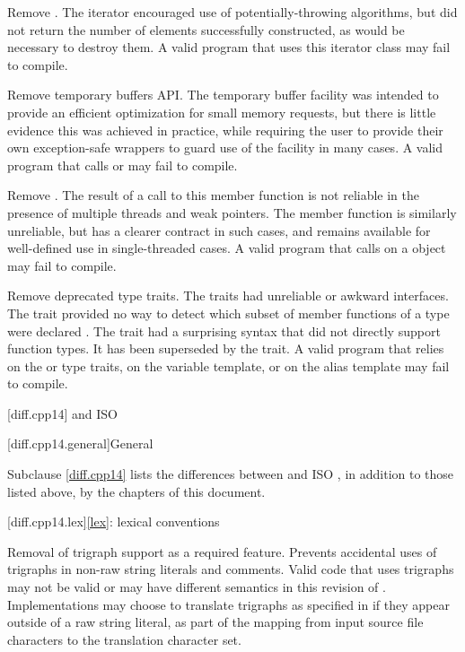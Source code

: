 \nodiffref
\change
Remove .
\rationale
The iterator encouraged use of potentially-throwing algorithms, but did
not return the number of elements successfully constructed,
as would be necessary to destroy them.
\effect
A valid \CppXVII{} program that uses this iterator class may fail to compile.

\nodiffref
\change
Remove temporary buffers API.
\rationale
The temporary buffer facility was intended to provide an efficient optimization
for small memory requests, but there is little evidence this was achieved in
practice, while requiring the user to provide their own exception-safe wrappers
to guard use of the facility in many cases.
\effect
A valid \CppXVII{} program that calls  or
 may fail to compile.

\nodiffref
\change
Remove .
\rationale
The result of a call to this member function is not reliable in the presence of
multiple threads and weak pointers. The member function  is
similarly unreliable, but has a clearer contract in such cases, and remains
available for well-defined use in single-threaded cases.
\effect
A valid \CppXVII{} program that calls  on a 
object may fail to compile.

\change
Remove deprecated type traits.
\rationale
The traits had unreliable or awkward interfaces. The 
trait provided no way to detect which subset of member
functions of a type were declared . The 
trait had a surprising syntax that did not directly support function types.
It has been superseded by the  trait.
\effect
A valid \CppXVII{} program that relies on the  or
 type traits, on the  variable template,
or on the  alias template may fail to compile.

[diff.cpp14]{\Cpp{} and ISO \CppXIV{}}

[diff.cpp14.general]{General}

\pnum
{}%
Subclause \ref{diff.cpp14} lists the differences between \Cpp{} and
ISO \CppXIV{},
in addition to those listed above,
by the chapters of this document.

[diff.cpp14.lex]{\ref*{lex}: lexical conventions}

%
\change
Removal of trigraph support as a required feature.
\rationale
Prevents accidental uses of trigraphs in non-raw string literals and comments.
\effect
Valid \CppXIV{} code that uses trigraphs may not be valid or may have different
semantics in this revision of \Cpp{}. Implementations may choose to
translate trigraphs as specified in \CppXIV{} if they appear outside of a raw
string literal, as part of the
mapping from input source file characters to
the translation character set.

